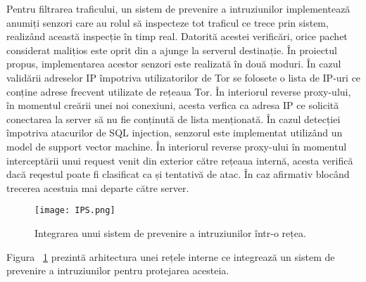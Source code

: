 Pentru filtrarea traficului, un sistem de prevenire a intruziunilor implementează anumiți senzori care au rolul să inspecteze tot traficul ce trece prin sistem, realizând această inspecție în timp real. Datorită acestei verificări, orice pachet considerat malițios este oprit din a ajunge la serverul destinație. În proiectul propus, implementarea acestor senzori este realizată în două moduri. În cazul validării adreselor IP împotriva utilizatorilor de Tor se folosete o lista de IP-uri ce conține adrese frecvent utilizate de rețeaua Tor. În interiorul reverse proxy-ului, în momentul creării unei noi conexiuni, acesta verfica ca adresa IP ce solicită conectarea la server să nu fie conținută de lista menționată. În cazul detecției împotriva atacurilor de SQL injection, senzorul este implementat utilizând un model de support vector machine. În interiorul reverse proxy-ului în momentul interceptării unui request venit din exterior către rețeaua internă, acesta verifică dacă reqestul poate fi clasificat ca și tentativă de atac. În caz afirmativ blocând trecerea acestuia mai departe către server. 
\begin{figure}[h]
	\centering
	\texttt{[image: IPS.png]}
	\caption{ Integrarea unui sistem de prevenire a intruziunilor într-o rețea. }
	\label{fig:ips-2nd-example}
\end{figure}

Figura ~\ref{fig:ips-2nd-example} prezintă arhitectura unei rețele interne ce integrează un sistem de prevenire a intruziunilor pentru protejarea acesteia.  \\

